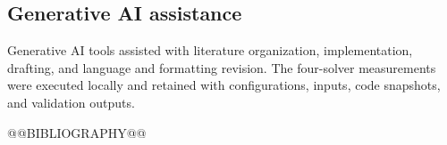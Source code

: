 \documentclass[10pt,letterpaper]{article}
\begin{document}
\subsection*{Generative AI assistance}
Generative AI tools assisted with literature organization, implementation, drafting, and language and formatting revision. The four-solver measurements were executed locally and retained with configurations, inputs, code snapshots, and validation outputs.

@@BIBLIOGRAPHY@@
\end{document}
